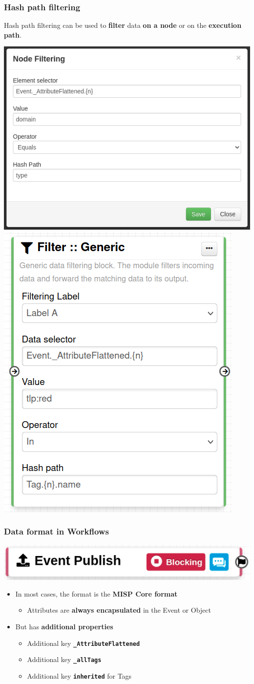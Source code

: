 \begin{frame}[fragile]
    \frametitle{Hash path filtering}
    Hash path filtering can be used to \textbf{filter} data \textbf{on a node} or on the \textbf{execution path}.
    \begin{center}
        \includegraphics[width=0.58\linewidth]{pictures/node-filtering.png}
        \includegraphics[width=0.4\linewidth]{pictures/node-generic-filter.png}
    \end{center}
\end{frame}

\begin{frame}
    \frametitle{Data format in Workflows}
    \begin{center}
        \includegraphics[width=0.7\linewidth]{pictures/workflow-trigger.png}
    \end{center}
    \begin{itemize}
        \item In most cases, the format is the \textbf{MISP Core format}
        \begin{itemize}
            \item Attributes are \textbf{always encapsulated} in the Event or Object
        \end{itemize}
        \item But has \textbf{additional properties}
        \begin{itemize}
            \item Additional key \textbf{\texttt{\_AttributeFlattened}}
            \item Additional key \textbf{\texttt{\_allTags}}
            \item Additional key \textbf{\texttt{inherited}} for Tags
        \end{itemize}
    \end{itemize}
\end{frame}

